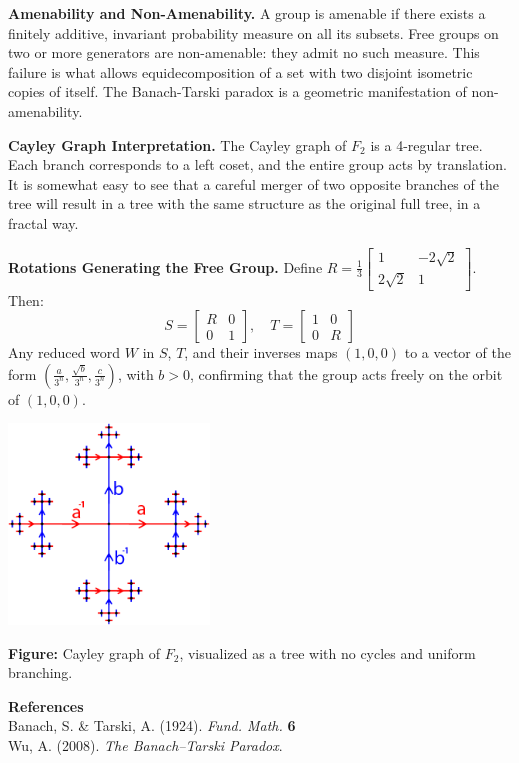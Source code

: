 \begin{technical}
    \columnbreak

    \textbf{Amenability and Non-Amenability.}  
    A group is amenable if there exists a finitely additive, invariant probability measure on all its subsets. Free groups on two or more generators are non-amenable: they admit no such measure. This failure is what allows equidecomposition of a set with two disjoint isometric copies of itself. The Banach-Tarski paradox is a geometric manifestation of non-amenability.

    \textbf{Cayley Graph Interpretation.}  
    The Cayley graph of \(F_2\) is a 4-regular tree. Each branch corresponds to a left coset, and the entire group acts by translation. It is somewhat easy to see that a careful merger of two opposite branches of the tree will result in a tree with the same structure as the original full tree, in a fractal way.

    \textbf{Rotations Generating the Free Group.}  
    Define $R = \frac{1}{3}\begin{bmatrix} 1 & -2\sqrt{2} \\ 2\sqrt{2} & 1 \end{bmatrix}$. Then:
    \[
    S = \begin{bmatrix} R & 0 \\ 0 & 1 \end{bmatrix}, \quad
    T = \begin{bmatrix} 1 & 0 \\ 0 & R \end{bmatrix}
    \]
    Any reduced word \(W\) in \(S\), \(T\), and their inverses maps \((1,0,0)\) to a vector of the form \(\left( \frac{a}{3^n}, \frac{\sqrt{b}}{3^n}, \frac{c}{3^n} \right)\), with \(b > 0\), confirming that the group acts freely on the orbit of \((1,0,0)\).

    \begin{center}
    \includegraphics[width=0.4\textwidth]{01_BanachTarskiParadox/F2_Cayley_Graph_tp.png}

    \vspace{0.5em}
    \small
    \textbf{Figure:} Cayley graph of \(F_2\), visualized as a tree with no cycles and uniform branching.
    \end{center}

    \vspace{0.5em}
    \noindent\textbf{References} \\
    Banach, S. \& Tarski, A. (1924). \textit{Fund. Math.} \textbf{6}\\
    Wu, A. (2008). \textit{The Banach--Tarski Paradox}.
\end{technical}